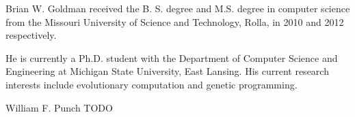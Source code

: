 \documentclass[journal]{IEEEtran}
\begin{document}




% 

\begin{IEEEbiography}{Brian W. Goldman}
received the B. S. degree and M.S. degree in computer science from the
Missouri University of Science and Technology, Rolla, in 2010
and 2012 respectively.

He is currently a Ph.D. student with the Department of Computer Science
and Engineering at Michigan State University, East Lansing.  His current
research interests include evolutionary computation and genetic programming.

\end{IEEEbiography}

\begin{IEEEbiographynophoto}{William F. Punch}
TODO
\end{IEEEbiographynophoto}







\end{document}
